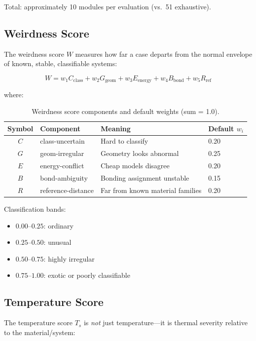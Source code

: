 \documentclass[11pt,a4paper]{article}
\begin{document}
Total: approximately 10 modules per evaluation (vs.\ 51 exhaustive).

\subsection{Weirdness Score}

The weirdness score $W$ measures how far a case departs from the normal
envelope of known, stable, classifiable systems:

\begin{equation}
  W = w_1 C_{\text{class}} + w_2 G_{\text{geom}} + w_3 E_{\text{energy}}
    + w_4 B_{\text{bond}} + w_5 R_{\text{ref}}
\end{equation}

\noindent where:
\begin{table}[h]
\centering
\begin{tabular}{clll}
\toprule
\textbf{Symbol} & \textbf{Component} & \textbf{Meaning} & \textbf{Default $w_i$} \\
\midrule
$C$ & class-uncertain    & Hard to classify                & 0.20 \\
$G$ & geom-irregular     & Geometry looks abnormal          & 0.25 \\
$E$ & energy-conflict    & Cheap models disagree            & 0.20 \\
$B$ & bond-ambiguity     & Bonding assignment unstable      & 0.15 \\
$R$ & reference-distance & Far from known material families & 0.20 \\
\bottomrule
\end{tabular}
\caption{Weirdness score components and default weights (sum = 1.0).}
\end{table}

\noindent Classification bands:
\begin{itemize}[nosep]
  \item $0.00$--$0.25$: ordinary
  \item $0.25$--$0.50$: unusual
  \item $0.50$--$0.75$: highly irregular
  \item $0.75$--$1.00$: exotic or poorly classifiable
\end{itemize}

\subsection{Temperature Score}

The temperature score $T_s$ is \emph{not} just temperature---it is thermal
severity relative to the material/system:
\end{document}
